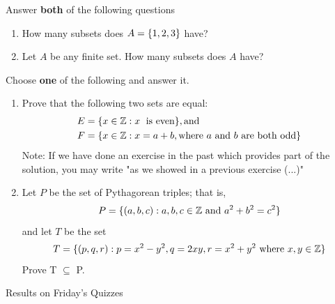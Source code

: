 \documentclass[10pt]{beamer}
\begin{document}
\begin{frame}
\footnotesize 
%

 \begin{myredbox}[title=Reading Quiz (Sets I)]
Answer \textbf{both} of the following questions
\begin{enumerate}
\item How many subsets does $A=\{ {1,2,3} \}$ have?
\item Let $A$ be any finite set.  How many subsets does $A$ have?	
\end{enumerate}

\end{myredbox}

\vfill \vfill 
 \begin{mygreenbox}[title=Extra Credit for Reading Quiz (Sets I)]
 Choose \textbf{one} of the following and answer it.
\begin{enumerate}
\item Prove that the following two sets are equal:
%
\begin{align*}
E &= \{ {x \in \mathbb{Z}: x \text{\; is even}} \}, \text{and} \\
F &= \{ {x \in \mathbb{Z}: x=a+b, \text{where $a$ and $b$ are both odd}} \}
\end{align*}
%
Note: If we have done an exercise in the past which provides part of the solution, you may write "as we showed in a previous exercise (...)"
\item Let $P$ be the set of Pythagorean triples; that is,
\[ P=\{ {(a,b,c): a,b,c \in \mathbb{Z} \text{ and } a^2+b^2 = c^2} \}\]
and let $T$ be the set
\[ T=\{ {(p,q,r): p=x^2-y^2, q=2xy, r=x^2+y^2 \text{ where } x,y \in \mathbb{Z}} \}\]
Prove T $\subseteq$ P.
\end{enumerate}
\end{mygreenbox}
\end{frame}


\begin{frame}[standout]
Results on Friday's Quizzes
\end{frame}
\end{document}
